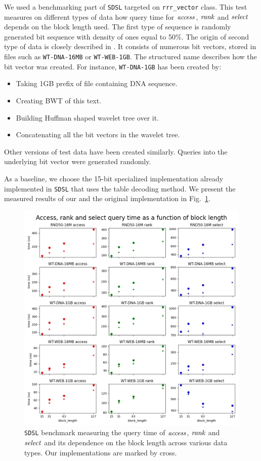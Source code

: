 We used a benchmarking part of \texttt{SDSL} targeted on \verb'rrr_vector' class. This test
measures on different types of data how query time for $\mathit{access}$, $\mathit{rank}$ and $\mathit{select}$ depends
on the block length used. The first type of sequence is randomly generated bit sequence with
density of ones equal to 50\%. The origin of second type of data is closely described in
\cite{gog2014optimized}. It consists of numerous bit vectors, stored in files such as
\texttt{WT-DNA-16MB} or \texttt{WT-WEB-1GB}. The structured name describes how the bit vector
was created. For instance, \texttt{WT-DNA-1GB} has been created by:
\begin{itemize}
	\item Taking 1GB prefix of file containing DNA sequence.
	\item Creating BWT of this text.
	\item Building Huffman shaped wavelet tree over it.
	\item Concatenating all the bit vectors in the wavelet tree.
\end{itemize}
Other versions of test data have been created similarly. Queries into the underlying bit vector
were generated randomly.

As a baseline, we choose the 15-bit specialized implementation already implemented in \texttt{SDSL}
that uses the table decoding method. We present the measured results of our and the original
implementation in Fig.~\ref{obr:benchmark_sdsl_new_method}.

\begin{figure}
	\centerline{
		\includegraphics[width=\textwidth, height=0.7\textheight]{images/benchmark_sdsl_new_method}
	}
	\caption[TODO]{\texttt{SDSL} benchmark measuring the query time of $\mathit{access}$, $\mathit{rank}$ and $\mathit{select}$
	and its dependence on the block length across various data types. Our implementations are marked
	by cross.
	}
	\label{obr:benchmark_sdsl_new_method}
\end{figure}

